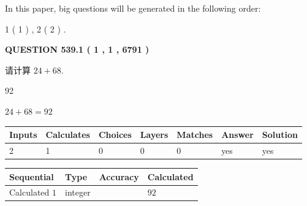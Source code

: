 \documentclass{ctexart}
\begin{document}
   
   
\vspace{0.2in}
   
In this paper, big questions will be generated in the following order: 
   
   
   1 ( 1 )
 ,
   2 ( 2 )
 .
  
\vspace{0.2in}
  
{\textbf{\Large{QUESTION
539.1 
 ( 1 , 1 , 6791 )
}}}
  
  
 
请计算 $ %
24 +  %
68 $.
 
 
 
\noindent{}
 
 

92
 
 
\noindent{}
 
 

 
 
 
\noindent{}
 
 

$ %
24 +  %
68=   %
92$
 
 
\noindent{}
 
 

 
   
   
   
   
\noindent\begin{tabular}{|l|l|l|l|l|l|l|}
 \hline
Inputs & Calculates & Choices & Layers & Matches & Answer & Solution \\ \hline
 2  & 
 1  & 
 0
  & 
 0  & 
 0  & 
  yes & 
  yes 
  \\ \hline
 \end{tabular}
   
   
   
   
\noindent{}
   
   
  
  
\noindent\begin{tabular}{|l|l|l|l|}
\hline
 Sequential & Type & Accuracy & Calculated \\ 
\hline
 
 
  Calculated $  1 $ & integer &  & 
  $ 92 $ 
 \\  \hline  
 \end{tabular}
   
\end{document}
